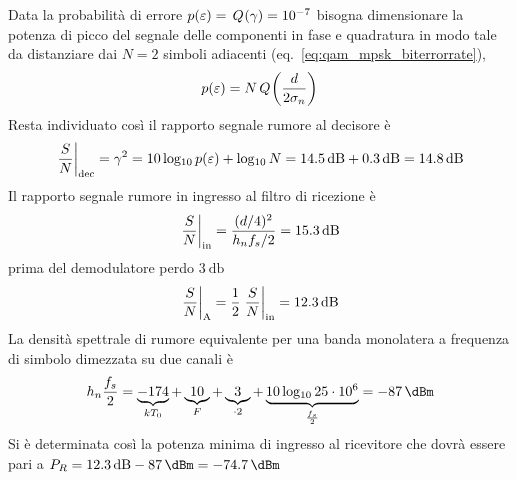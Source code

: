 Data la probabilità di errore $p(\varepsilon)=\,{Q}^{}\!\left({\gamma}\right)=\num{e-7}$ bisogna dimensionare la potenza di picco del segnale delle componenti in fase e quadratura in modo tale da distanziare dai $N=2$ simboli adiacenti (eq.~\ref{eq:qam_mpsk_biterrorrate}), 
\[p(\varepsilon)=N\,{Q}^{}\!\left({\frac{d}{2\sigma_n}}\right)\]
Resta individuato così il rapporto segnale rumore al decisore è \[\restrict{\frac{S}{N}}{\text{dec}}=\gamma^2=10\Log{p(\epsilon)}+\Log N=\SI{14.5}{\decibel}+\SI{0.3}{\decibel}=\SI{14.8}{\decibel}\]
Il rapporto segnale rumore in ingresso al filtro di ricezione è
\[\restrict{\frac{S}{N}}{\text{in}}=\frac{(d/4)^2}{h_n f_s/2}=\SI{15.3}{\decibel}\]
prima del demodulatore perdo $\SI{3}{\decibel}$
\[\restrict{\frac{S}{N}}{\text{A}}=\frac{1}{2}\restrict{\frac{S}{N}}{\text{in}}=\SI{12.3}{\decibel}\]
La densità spettrale di rumore equivalente per una banda monolatera a frequenza di simbolo dimezzata su due canali è
\[h_n \frac{f_s}{2}=\underbrace{-174}_{k T_0}+\underbrace{10}_{F}+\underbrace{3}_{\cdot 2}+\underbrace{10\Log{25\cdot 10^6}}_{\frac{f_s}{2}}=\SI{-87}{\dBm}\]
Si è determinata così la potenza minima di ingresso al ricevitore che dovrà essere pari a $P_R=\SI{12.3}{\dB}-\SI{87}{\dBm}=\SI{-74.7}{\dBm}$